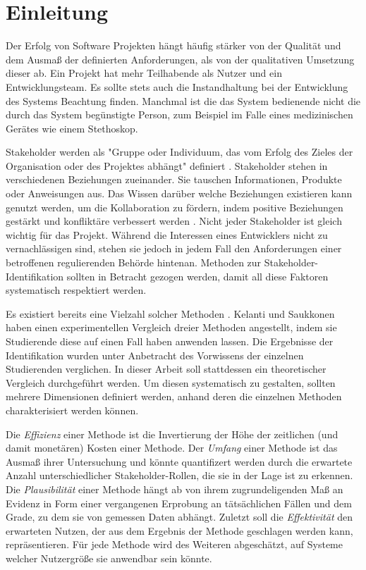 
\section{Einleitung}

Der Erfolg von Software Projekten hängt häufig stärker von der Qualität und dem Ausmaß der definierten Anforderungen, als von der qualitativen Umsetzung dieser ab. Ein Projekt hat mehr Teilhabende als Nutzer und ein Entwicklungsteam. Es sollte stets auch die Instandhaltung bei der Entwicklung des Systems Beachtung finden. Manchmal ist die das System bedienende nicht die durch das System begünstigte Person, zum Beispiel im Falle eines medizinischen Gerätes wie einem Stethoskop.

Stakeholder werden als "Gruppe oder Individuum, das vom Erfolg des Zieles der Organisation oder des Projektes abhängt" definiert \cite{sharp}.
Stakeholder stehen in verschiedenen Beziehungen zueinander. Sie tauschen Informationen, Produkte oder Anweisungen aus. Das Wissen darüber welche Beziehungen existieren kann genutzt werden, um die Kollaboration zu fördern, indem positive Beziehungen gestärkt und konfliktäre verbessert werden
\cite{mcmanus}.
Nicht jeder Stakeholder ist gleich wichtig für das Projekt. Während die Interessen eines Entwicklers nicht zu vernachlässigen sind, stehen sie jedoch in jedem Fall den Anforderungen einer betroffenen regulierenden Behörde hintenan.
Methoden zur Stakeholder-Identifikation sollten in Betracht gezogen werden, damit all diese Faktoren systematisch respektiert werden.

Es existiert bereits eine Vielzahl solcher Methoden \cite{sharp, mcmanus, stakenet, lauesen, alexander}. Kelanti und Saukkonen haben einen experimentellen Vergleich dreier Methoden \cite{sharp, mcmanus, lauesen} angestellt, indem sie Studierende diese auf einen Fall haben anwenden lassen. Die Ergebnisse der Identifikation wurden unter
Anbetracht des Vorwissens der einzelnen Studierenden verglichen. In dieser Arbeit soll stattdessen ein theoretischer Vergleich durchgeführt werden. Um diesen systematisch zu gestalten, sollten mehrere Dimensionen definiert werden, anhand deren die einzelnen Methoden charakterisiert werden können.

Die \textit{Effizienz} einer Methode ist die Invertierung der Höhe der zeitlichen (und damit monetären) Kosten einer Methode. Der \textit{Umfang} einer Methode ist das Ausmaß ihrer Untersuchung und könnte quantifizert werden durch die erwartete Anzahl unterschiedlicher Stakeholder-Rollen, die sie in der Lage ist zu erkennen. Die \textit{Plausibilität} einer Methode hängt ab von ihrem zugrundeligenden Maß an Evidenz in Form einer vergangenen Erprobung an tätsächlichen Fällen und dem
Grade, zu dem sie von gemessen Daten abhängt. Zuletzt soll die \textit{Effektivität} den erwarteten Nutzen, der aus dem Ergebnis der Methode geschlagen werden kann, repräsentieren. Für jede Methode wird des Weiteren abgeschätzt, auf Systeme welcher Nutzergröße sie anwendbar sein könnte.


